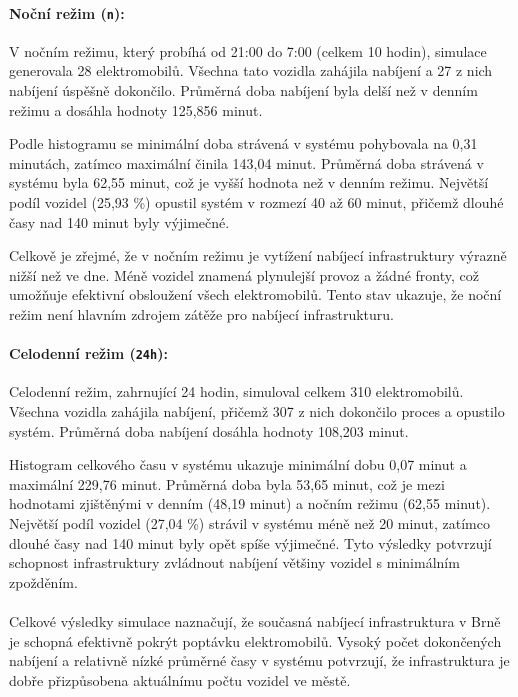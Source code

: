 \documentclass[a4paper,11pt]{article}
\begin{document}
\paragraph{Noční režim (\texttt{n}):}
V nočním režimu, který probíhá od 21:00 do 7:00 (celkem 10 hodin), simulace generovala 28 elektromobilů. Všechna tato vozidla zahájila nabíjení a 27 z nich nabíjení úspěšně dokončilo. Průměrná doba nabíjení byla delší než v denním režimu a dosáhla hodnoty 125,856 minut.

Podle histogramu se minimální doba strávená v systému pohybovala na 0,31 minutách, zatímco maximální činila 143,04 minut. Průměrná doba strávená v systému byla 62,55 minut, což je vyšší hodnota než v denním režimu. Největší podíl vozidel (25,93 \%) opustil systém v rozmezí 40 až 60 minut, přičemž dlouhé časy nad 140 minut byly výjimečné.

Celkově je zřejmé, že v nočním režimu je vytížení nabíjecí infrastruktury výrazně nižší než ve dne. Méně vozidel znamená plynulejší provoz a žádné fronty, což umožňuje efektivní obsloužení všech elektromobilů. Tento stav ukazuje, že noční režim není hlavním zdrojem zátěže pro nabíjecí infrastrukturu.


\paragraph{Celodenní režim (\texttt{24h}):}
Celodenní režim, zahrnující 24 hodin, simuloval celkem 310 elektromobilů. Všechna vozidla zahájila nabíjení, přičemž 307 z nich dokončilo proces a opustilo systém. Průměrná doba nabíjení dosáhla hodnoty 108,203 minut.

Histogram celkového času v systému ukazuje minimální dobu 0,07 minut a maximální 229,76 minut. Průměrná doba byla 53,65 minut, což je mezi hodnotami zjištěnými v denním (48,19 minut) a nočním režimu (62,55 minut). Největší podíl vozidel (27,04 \%) strávil v systému méně než 20 minut, zatímco dlouhé časy nad 140 minut byly opět spíše výjimečné. Tyto výsledky potvrzují schopnost infrastruktury zvládnout nabíjení většiny vozidel s minimálním zpožděním.

\paragraph{} 
Celkové výsledky simulace naznačují, že současná nabíjecí infrastruktura v Brně je schopná efektivně pokrýt poptávku elektromobilů. Vysoký počet dokončených nabíjení a relativně nízké průměrné časy v systému potvrzují, že infrastruktura je dobře přizpůsobena aktuálnímu počtu vozidel ve městě.
\end{document}
